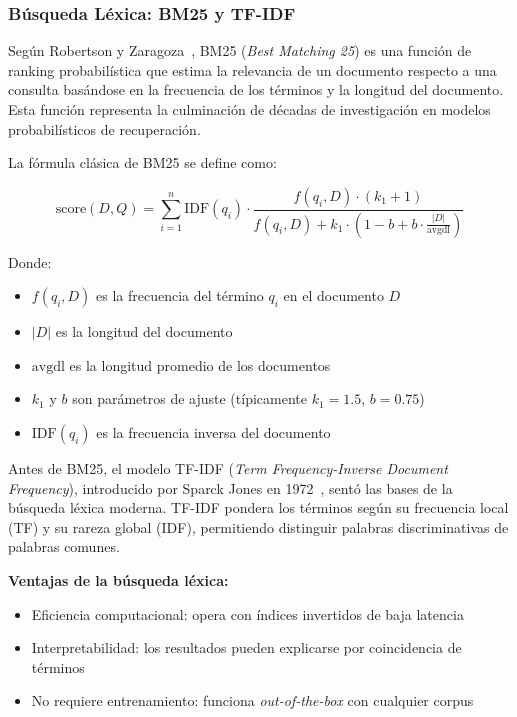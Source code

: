 \subsubsection{B\'usqueda L\'exica: BM25 y TF-IDF}
\label{subsubsec:bm25-tfidf}

Seg\'un Robertson y Zaragoza~\cite{robertson2009bm25}, BM25 (\textit{Best Matching 25}) es una funci\'on de ranking probabil\'istica que estima la relevancia de un documento respecto a una consulta bas\'andose en la frecuencia de los t\'erminos y la longitud del documento. Esta funci\'on representa la culminaci\'on de d\'ecadas de investigaci\'on en modelos probabil\'isticos de recuperaci\'on.

La f\'ormula cl\'asica de BM25 se define como:

\begin{equation}
\label{eq:bm25}
\text{score}(D, Q) = \sum_{i=1}^{n} \text{IDF}(q_i) \cdot \frac{f(q_i, D) \cdot (k_1 + 1)}{f(q_i, D) + k_1 \cdot \left(1 - b + b \cdot \frac{|D|}{\text{avgdl}}\right)}
\end{equation}

Donde:
\begin{itemize}
    \item $f(q_i, D)$ es la frecuencia del t\'ermino $q_i$ en el documento $D$
    \item $|D|$ es la longitud del documento
    \item $\text{avgdl}$ es la longitud promedio de los documentos
    \item $k_1$ y $b$ son par\'ametros de ajuste (t\'ipicamente $k_1=1.5$, $b=0.75$)
    \item $\text{IDF}(q_i)$ es la frecuencia inversa del documento
\end{itemize}

Antes de BM25, el modelo TF-IDF (\textit{Term Frequency-Inverse Document Frequency}), introducido por Sparck Jones en 1972~\cite{sparck1972tfidf}, sent\'o las bases de la b\'usqueda l\'exica moderna. TF-IDF pondera los t\'erminos seg\'un su frecuencia local (TF) y su rareza global (IDF), permitiendo distinguir palabras discriminativas de palabras comunes.

\textbf{Ventajas de la b\'usqueda l\'exica:}
\begin{itemize}
    \item Eficiencia computacional: opera con \'indices invertidos de baja latencia
    \item Interpretabilidad: los resultados pueden explicarse por coincidencia de t\'erminos
    \item No requiere entrenamiento: funciona \textit{out-of-the-box} con cualquier corpus
\end{itemize}

